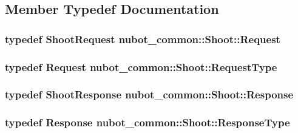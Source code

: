 \subsection{Member Typedef Documentation}
\hypertarget{structnubot__common_1_1Shoot_a8d200603298d1fe7377f13911e7d5bdc}{
\subsubsection[{Request}]{\setlength{\rightskip}{0pt plus 5cm}typedef {\bf Shoot\-Request} {\bf nubot\-\_\-common\-::\-Shoot\-::\-Request}}}\label{structnubot__common_1_1Shoot_a8d200603298d1fe7377f13911e7d5bdc}
\hypertarget{structnubot__common_1_1Shoot_a00fabefc36af40105d07c4ad3373f0e2}{
\subsubsection[{Request\-Type}]{\setlength{\rightskip}{0pt plus 5cm}typedef {\bf Request} {\bf nubot\-\_\-common\-::\-Shoot\-::\-Request\-Type}}}\label{structnubot__common_1_1Shoot_a00fabefc36af40105d07c4ad3373f0e2}
\hypertarget{structnubot__common_1_1Shoot_a4d609a5e9faac9c7c0d32b7cf0eb5738}{
\subsubsection[{Response}]{\setlength{\rightskip}{0pt plus 5cm}typedef {\bf Shoot\-Response} {\bf nubot\-\_\-common\-::\-Shoot\-::\-Response}}}\label{structnubot__common_1_1Shoot_a4d609a5e9faac9c7c0d32b7cf0eb5738}
\hypertarget{structnubot__common_1_1Shoot_a7a2ab7b3d778ea57959a3f760ca447ea}{
\subsubsection[{Response\-Type}]{\setlength{\rightskip}{0pt plus 5cm}typedef {\bf Response} {\bf nubot\-\_\-common\-::\-Shoot\-::\-Response\-Type}}}\label{structnubot__common_1_1Shoot_a7a2ab7b3d778ea57959a3f760ca447ea}



